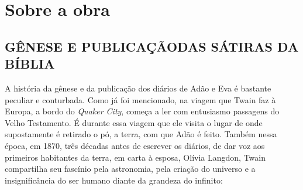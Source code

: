 \section{Sobre a obra}


\subsection{GÊNESE E PUBLICAÇÃO\break DAS SÁTIRAS DA BÍBLIA}

A história da gênese e da publicação dos diários de Adão e Eva é bastante
peculiar e conturbada. Como já foi mencionado, na viagem que
Twain faz à Europa, a bordo do \textit{Quaker City}, começa a ler com entusiasmo
passagens do Velho Testamento. É durante essa viagem que ele visita o lugar de
onde supostamente é retirado o pó, a terra, com que Adão é feito. Também
nessa época, em 1870, três décadas antes de escrever os diários, de dar voz
aos primeiros habitantes da terra, em carta à esposa, Olívia Langdon,
Twain compartilha seu fascínio pela astronomia, pela criação do universo e
a insignificância do ser humano diante da grandeza do infinito:

